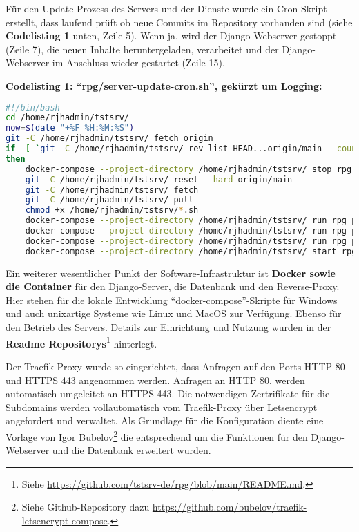 Für den Update-Prozess des Servers und der Dienste wurde ein Cron-Skript erstellt, dass laufend prüft ob neue Commits im Repository vorhanden sind (siehe \textbf{Codelisting 1} unten, Zeile 5). Wenn ja, wird der Django-Webserver gestoppt (Zeile 7), die neuen Inhalte heruntergeladen, verarbeitet und der Django-Webserver im Anschluss wieder gestartet (Zeile 15). 

\textbf{Codelisting 1: \enquote{rpg/server-update-cron.sh}, gekürzt um Logging:}
\begin{lstlisting}[language=bash]
#!/bin/bash
cd /home/rjhadmin/tstsrv/
now=$(date "+%F %H:%M:%S")
git -C /home/rjhadmin/tstsrv/ fetch origin 
if  [ `git -C /home/rjhadmin/tstsrv/ rev-list HEAD...origin/main --count` != 0 ] 
then
    docker-compose --project-directory /home/rjhadmin/tstsrv/ stop rpg  
    git -C /home/rjhadmin/tstsrv/ reset --hard origin/main  
    git -C /home/rjhadmin/tstsrv/ fetch
    git -C /home/rjhadmin/tstsrv/ pull 
    chmod +x /home/rjhadmin/tstsrv/*.sh 
    docker-compose --project-directory /home/rjhadmin/tstsrv/ run rpg python rpg/manage.py makemigrations 
    docker-compose --project-directory /home/rjhadmin/tstsrv/ run rpg python rpg/manage.py migrate 
    docker-compose --project-directory /home/rjhadmin/tstsrv/ run rpg python rpg/manage.py loaddata db_sample_data.json 
    docker-compose --project-directory /home/rjhadmin/tstsrv/ start rpg 
\end{lstlisting}



Ein weiterer wesentlicher Punkt der Software-Infrastruktur ist \textbf{Docker sowie die Container} für den Django-Server, die Datenbank und den Reverse-Proxy. Hier stehen für die lokale Entwicklung \enquote{docker-compose}-Skripte für Windows und auch unixartige Systeme wie Linux und MacOS zur Verfügung. Ebenso für den Betrieb des Servers. Details zur Einrichtung und Nutzung wurden in der \textbf{Readme Repositorys}\footnote{Siehe \url{https://github.com/tstsrv-de/rpg/blob/main/README.md}.} hinterlegt. 


Der Traefik-Proxy wurde so eingerichtet, dass Anfragen auf den Ports HTTP 80 und HTTPS 443 angenommen werden. Anfragen an HTTP 80, werden automatisch umgeleitet an HTTPS 443. Die notwendigen Zertrifikate für die Subdomains werden vollautomatisch vom Traefik-Proxy über Letsencrypt angefordert und verwaltet. Als Grundlage für die Konfiguration diente eine Vorlage von Igor Bubelov\footnote{Siehe Github-Repository dazu \url{https://github.com/bubelov/traefik-letsencrypt-compose}.} die entsprechend um die Funktionen für den Django-Webserver und die Datenbank erweitert wurden.



